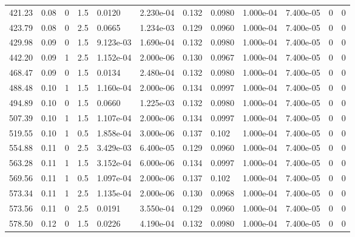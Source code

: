 \documentclass[preview]{standalone}
\begin{document}
{{\begin{tabular}{L{1.2cm}C{1.2cm} C{0.3cm}C{0.5cm} C{1.4cm}C{1.4cm} C{1.4cm}C{1.4cm} C{1.6cm}C{1.6cm} C{1.6cm}C{1.6cm}}
  421.23  &  0.08  & 0     & 1.5 &  0.0120  & 2.230e-04  &  0.132&   0.0980& 1.000e-04 & 7.400e-05   &  0 & 0  \\ 
  423.79  &  0.08  & 0     & 2.5 &  0.0665  & 1.234e-03  &  0.129&   0.0960& 1.000e-04 & 7.400e-05   &  0 & 0  \\ 
  429.98  &  0.09  & 0     & 1.5 &  9.123e-03  & 1.690e-04  &  0.132&   0.0980& 1.000e-04 & 7.400e-05   &  0 & 0  \\ 
  442.20  &  0.09  & 1     & 2.5 &  1.152e-04  & 2.000e-06  &  0.130&   0.0967& 1.000e-04 & 7.400e-05   &  0 & 0  \\ 
  468.47  &  0.09  & 0     & 1.5 &  0.0134  & 2.480e-04  &  0.132&   0.0980& 1.000e-04 & 7.400e-05   &  0 & 0  \\ 
  488.48  &  0.10  & 1     & 1.5 &  1.160e-04  & 2.000e-06  &  0.134&   0.0997& 1.000e-04 & 7.400e-05   &  0 & 0  \\ 
  494.89  &  0.10  & 0     & 1.5 &  0.0660  & 1.225e-03  &  0.132&   0.0980& 1.000e-04 & 7.400e-05   &  0 & 0  \\ 
  507.39  &  0.10  & 1     & 1.5 &  1.107e-04  & 2.000e-06  &  0.134&   0.0997& 1.000e-04 & 7.400e-05   &  0 & 0  \\ 
  519.55  &  0.10  & 1     & 0.5 &  1.858e-04  & 3.000e-06  &  0.137&   0.102& 1.000e-04 & 7.400e-05   &  0 & 0  \\ 
  554.88  &  0.11  & 0     & 2.5 &  3.429e-03  & 6.400e-05  &  0.129&   0.0960& 1.000e-04 & 7.400e-05   &  0 & 0  \\ 
  563.28  &  0.11  & 1     & 1.5 &  3.152e-04  & 6.000e-06  &  0.134&   0.0997& 1.000e-04 & 7.400e-05   &  0 & 0  \\ 
  569.56  &  0.11  & 1     & 0.5 &  1.097e-04  & 2.000e-06  &  0.137&   0.102& 1.000e-04 & 7.400e-05   &  0 & 0  \\ 
  573.34  &  0.11  & 1     & 2.5 &  1.135e-04  & 2.000e-06  &  0.130&   0.0968& 1.000e-04 & 7.400e-05   &  0 & 0  \\ 
  573.56  &  0.11  & 0     & 2.5 &  0.0191  & 3.550e-04  &  0.129&   0.0960& 1.000e-04 & 7.400e-05   &  0 & 0  \\ 
  578.50  &  0.12  & 0     & 1.5 &  0.0226  & 4.190e-04  &  0.132&   0.0980& 1.000e-04 & 7.400e-05   &  0 & 0  \\ 
\hline 
\end{tabular} 

}}
\end{document}
